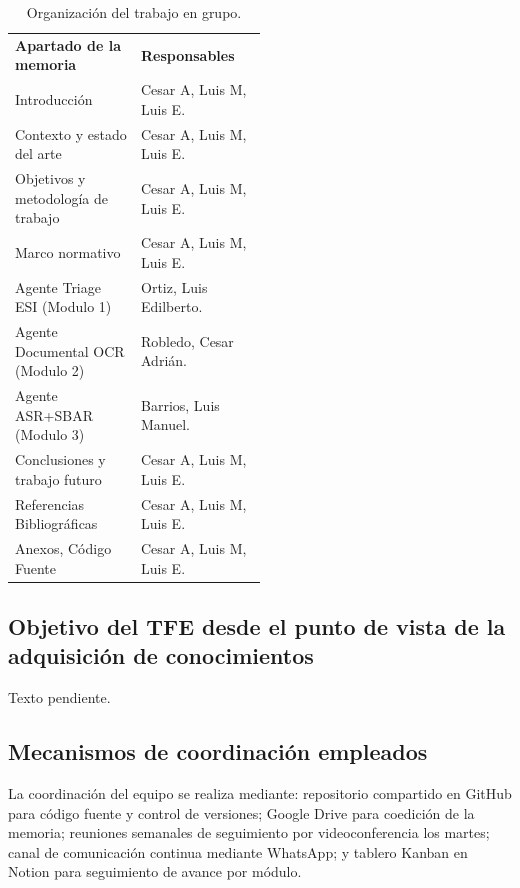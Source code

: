 \begin{table}[H]
  \centering
  \small
  \caption{Organización del trabajo en grupo.}
  \label{tab:phases}
  \begingroup
  \begin{tabularx}{\linewidth}{|>{\raggedright\arraybackslash}p{0.5\linewidth}|>{\raggedright\arraybackslash}X|}
  \hline
  \rowcolor{unirTableHeader}
  \multicolumn{2}{|c|}{\textcolor{white}{\textbf{Organización del trabajo en grupo.}}} \\
  \hline
  \rowcolor{unirTableBand}
  \textbf{Apartado de la memoria} & \textbf{Responsables} \\
  \hline
  Introducción & Cesar A, Luis M, Luis E. \\
  \hline
  \rowcolor{unirTableBand}
  Contexto y estado del arte & Cesar A, Luis M, Luis E. \\
  \hline
  Objetivos y metodología de trabajo  & Cesar A, Luis M, Luis E. \\
  \hline
  \rowcolor{unirTableBand}
  Marco normativo  & Cesar A, Luis M, Luis E. \\
  \hline
  Agente Triage ESI (Modulo 1)  & Ortiz, Luis Edilberto. \\
  \hline
  \rowcolor{unirTableBand}
  Agente Documental OCR (Modulo 2)  & Robledo, Cesar Adrián. \\
  \hline
  Agente ASR+SBAR (Modulo 3)  & Barrios, Luis Manuel. \\
  \hline
  \rowcolor{unirTableBand}
 Conclusiones y trabajo futuro  & Cesar A, Luis M, Luis E. \\
  \hline
  Referencias Bibliográficas  & Cesar A, Luis M, Luis E. \\
  \hline
  \rowcolor{unirTableBand}
 Anexos, Código Fuente  & Cesar A, Luis M, Luis E. \\
  \hline
  \end{tabularx}
  \endgroup
\end{table}


\subsection*{Objetivo del TFE desde el punto de vista de la adquisición de conocimientos}
Texto pendiente.

\subsection*{Mecanismos de coordinación empleados}
La coordinación del equipo se realiza mediante: repositorio compartido en GitHub para código fuente y control de versiones; Google Drive para coedición de la memoria; reuniones semanales de seguimiento por videoconferencia los martes; canal de comunicación continua mediante WhatsApp; y tablero Kanban en Notion para seguimiento de avance por módulo.
